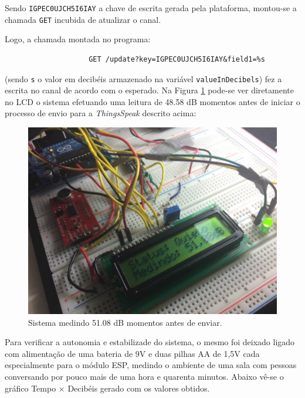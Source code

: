 \documentclass[
    12pt,               %
    openright,          %
    oneside,
    a4paper,            
    english,            %
    brazil              %
    ]{abntex2}
\begin{document}
Sendo \texttt{IGPEC0UJCH5I6IAY} a chave de escrita gerada pela plataforma, montou-se a chamada \texttt{GET} incubida de atualizar o canal.

Logo, a chamada montada no programa:

\begin{verbatim}
                    GET /update?key=IGPEC0UJCH5I6IAY&field1=%s
\end{verbatim}

(sendo \texttt{s} o valor em decibéis armazenado na variável \texttt{valueInDecibels}) fez a escrita no canal de acordo com o esperado. Na Figura \ref{cinq} pode-se ver diretamente no LCD o sistema efetuando uma leitura de 48.58 dB momentos antes de iniciar o processo de envio para a \textit{ThingsSpeak} descrito acima:

\begin{figure}[!htb]
  \begin{center}
    \caption{\label{cinq}Sistema medindo 51.08 dB momentos antes de enviar.}
    \includegraphics[scale=0.19]{images/cinq.jpg}
  \end{center}
\end{figure} 

Para verificar a autonomia e estabilizade do sistema, o mesmo foi deixado ligado com alimentação de uma bateria de 9V e duas pilhas AA de 1,5V cada especialmente para o módulo ESP, medindo o ambiente de uma sala com pessoas conversando por pouco mais de uma hora e quarenta minutos. Abaixo vê-se o gráfico Tempo $\times$ Decibéis gerado com os valores obtidos.
\end{document}
